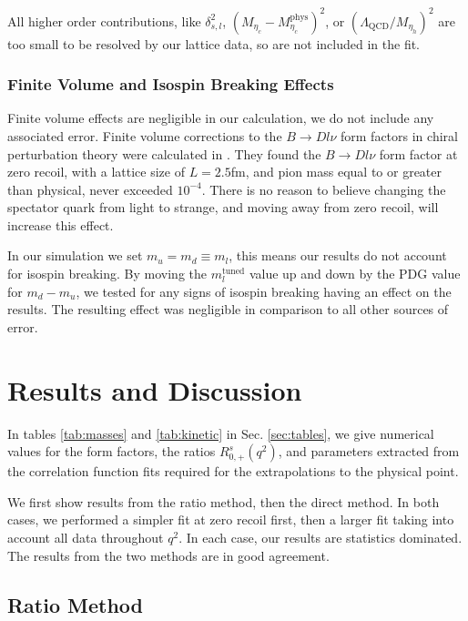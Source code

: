 All higher order contributions, like $\delta_{s,l}^2$, $(M_{\eta_c}-M_{\eta_c}^{\text{phys}})^2$, or $(\Lambda_{\text{QCD}}/ M_{\eta_h})^2$ are too small to be resolved by our lattice data, so are not included in the fit.

\subsubsection{Finite Volume and Isospin Breaking Effects}

Finite volume effects are negligible in our calculation, we do not include any associated error. Finite volume corrections to the $B\to Dl\nu$ form factors in chiral perturbation theory were calculated in \cite{Laiho:2005ue}. They found the $B\to Dl\nu$ form factor at zero recoil, with a lattice size of $L=2.5$fm, and pion mass equal to or greater than physical, never exceeded $10^{-4}$. There is no reason to believe changing the spectator quark from light to strange, and moving away from zero recoil, will increase this effect.

In our simulation we set $m_u=m_d\equiv m_l$, this means our results do not account for isospin breaking. By moving the $m_l^{\text{tuned}}$ value up and down by the PDG value for $m_d-m_u$, we tested for any signs of isospin breaking having an effect on the results. The resulting effect was negligible in comparison to all other sources of error.

\section{Results and Discussion}
\label{sec:results}

In tables \ref{tab:masses} and \ref{tab:kinetic} in Sec. \ref{sec:tables}, we give numerical values for the form factors, the ratios $R_{0,+}^s(q^2)$, and parameters extracted from the correlation function fits required for the extrapolations to the physical point.

We first show results from the ratio method, then the direct method. In both cases, we performed a simpler fit at zero recoil first, then a larger fit taking into account all data throughout $q^2$.  In each case, our results are statistics dominated. The results from the two methods are in good agreement.

\subsection{Ratio Method}
\label{sec:ratiomethod}

